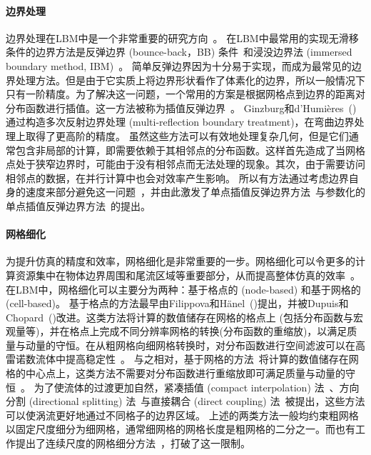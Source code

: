 \paragraph{边界处理}
边界处理在LBM中是一个非常重要的研究方向~\cite{Marson-2022}。
在LBM中最常用的实现无滑移条件的边界方法是反弹边界 (bounce-back，BB) 条件~\cite{Ladd-1994, Bouzidi-2001, Ginzburg-2003, Chun-2007}和浸没边界法 (immersed boundary method, IBM)~\cite{Peskin-1972, Lu-2012, Kang-2011, Patel-2018, Seo-2011, Chen-2013}。
简单反弹边界因为十分易于实现，而成为最常见的边界处理方法。但是由于它实质上将边界形状看作了体素化的边界，所以一般情况下只有一阶精度。为了解决这一问题，一个常用的方案是根据网格点到边界的距离对分布函数进行插值。这一方法被称为插值反弹边界~\cite{Bouzidi-2001, Yu-2003}。
Ginzburg和d'Humières~(\citeyear{Ginzburg-2003}) 通过构造多次反射边界处理 (multi-reflection boundary treatment)，在弯曲边界处理上取得了更高阶的精度。
虽然这些方法可以有效地处理复杂几何，但是它们通常包含非局部的计算，即需要依赖于其相邻点的分布函数。这样首先造成了当网格点处于狭窄边界时，可能由于没有相邻点而无法处理的现象。其次，由于需要访问相邻点的数据，在并行计算中也会对效率产生影响。
所以有方法通过考虑边界自身的速度来部分避免这一问题~\cite{Chun-2007}，并由此激发了单点插值反弹边界方法~\cite{Zhao-2017, Geier-2015, Tao-2018-b}与参数化的单点插值反弹边界方法~\cite{Zhao-2019, Chen-2021-b, Marson-2021}的提出。

\paragraph{网格细化}
为提升仿真的精度和效率，网格细化是非常重要的一步。网格细化可以令更多的计算资源集中在物体边界周围和尾流区域等重要部分，从而提高整体仿真的效率~\cite{Sandoval-2012}。在LBM中，网格细化可以主要分为两种：基于格点的 (node-based) 和基于网格的 (cell-based)。
基于格点的方法最早由Filippova和Hänel~(\citeyear{Filippova-1998})提出，并被Dupuis和Chopard~(\citeyear{Dupuis-2003})改进。这类方法将计算的数值储存在网格的格点上 (包括分布函数与宏观量等)，并在格点上完成不同分辨率网格的转换(分布函数的重缩放)，以满足质量与动量的守恒。在从粗网格向细网格转换时，对分布函数进行空间滤波可以在高雷诺数流体中提高稳定性~\cite{Lagrava-2012}。
与之相对，基于网格的方法~\cite{Rohde-2006, Chen-2006}将计算的数值储存在网格的中心点上，这类方法不需要对分布函数进行重缩放即可满足质量与动量的守恒~\cite{Schornbaum-2016, Hasert-2014, Latt-2021}。
为了使流体的过渡更加自然，紧凑插值 (compact interpolation) 法~\cite{Fard-2015}、方向分割 (directional splitting) 法~\cite{Gendre-2017}与直接耦合 (direct coupling) 法~\cite{Astoul-2021}被提出，这些方法可以使涡流更好地通过不同格子的边界区域。
上述的两类方法一般均约束粗网格以固定尺度细分为细网格，通常细网格的网格长度是粗网格的二分之一。而也有工作提出了连续尺度的网格细分方法~\cite{Li-2019}，打破了这一限制。


